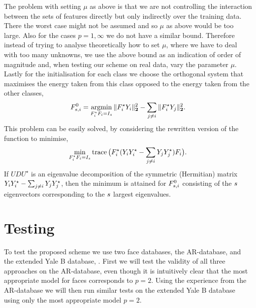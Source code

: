 \documentclass[11pt]{article}
\begin{document}
The problem with setting $\mu$ as above is that we are not controlling the interaction between the sets of features directly but only indirectly over the training data. There the worst case might not be assumed and so $\mu$ as above would be too large. Also for the cases $p=1,\infty$ we do not have a similar bound. Therefore instead of trying to analyse theoretically how to set $\mu$, where we have to deal with too many unknowns, we use the above bound as an indication of order of magnitude and, when testing our scheme on real data, vary the parameter $\mu$.
Lastly for the initialisation for each class we choose the orthogonal system that maximises the energy taken from this class opposed to the energy taken from the other classes, \ie
\begin{align}
{F}_{s,i}^0 = \operatorname*{argmin}_{{F}_i^\star {F}_i=I_s} \|{F}_i^\star {Y}_i\|^2_{\mathbf{2}} - \sum_{j\neq i}  \|{F}_i^\star {Y}_j \|^2_{\mathbf{2}}.
\end{align}
This problem can be easily solved, by considering the rewritten version of the function to minimise,
\begin{align}
\min_{{F}_i^\star {F}_i=I_s} \operatorname{trace} \big({F}_i^\star ( {Y}_i{Y}_i^\star - \sum_{j\neq i }{Y}_j{Y}_j^\star    ){F}_i\big).
\end{align}
If $UDU^\star$ is an eigenvalue decomposition of the symmetric (Hermitian) matrix ${Y}_i{Y}_i^\star - \sum_{j\neq i }{Y}_j{Y}_j^\star $, then the minimum is attained for ${F}_{s,i}^0$ consisting of the ${s}$ eigenvectors corresponding to the ${s}$ largest eigenvalues.

\section{Testing\label{sec:testing}}
To test the proposed scheme we use two face databases, the AR-database, \cite{mabe98} and the extended Yale B database, \cite{yaleb}. First we will test the validity of all three approaches on the AR-database, even though it is intuitively clear that the most appropriate model for faces corresponds to $p=2$. Using the experience from the AR-database we will then run similar tests on the extended Yale B database using only the most appropriate model $p=2$.
\end{document}
